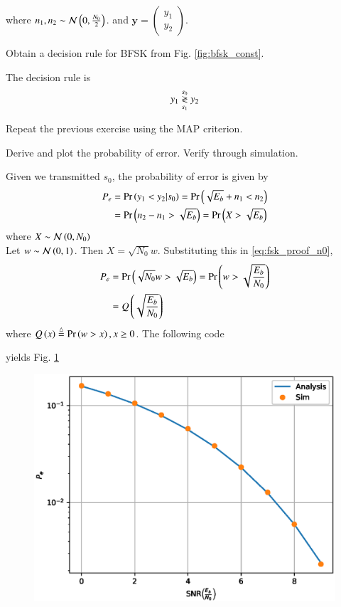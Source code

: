 \documentclass[journal,12pt,twocolumn]{IEEEtran}
\begin{document}
where $n_1,n_2 \sim \mathcal{N}\left(0,\frac{N_0}{2}\right)$. and
$
\mathbf{y} = 
\begin{pmatrix*}
y_{1}\\
 y_{2}
\end{pmatrix*}
$.
\begin{problem}
Obtain a decision rule for BFSK from Fig. \ref{fig:bfsk_const}.
\end{problem}
\solution The decision rule is
\begin{equation}
y_1 \overset{s_0}{\underset{s_1}{\gtrless}} y_2
\end{equation}
\begin{problem}
Repeat the previous exercise using the MAP criterion.
\end{problem}
\begin{problem}
Derive and plot the probability of error.  Verify through simulation.
\end{problem}
\solution Given we transmitted $s_0$, the probability of error is given by
\begin{align}
P_e &= \Pr\left(y_1 < y_2|s_0\right) = \Pr\left(\sqrt{E_b} + n_1 < n_2\right)
\\
&= \Pr\left( n_2-n_1 > \sqrt{E_b} \right) = \Pr\left( X > \sqrt{E_b} \right)
\label{eq:bfsk_proof_n0}
\end{align}
where $X \sim \mathcal{N}\left(0,N_0\right)$
\\
Let $w \sim \mathcal{N}\left(0,1\right)$.  Then $X = \sqrt{N_0}w$. Substituting this in \eqref{eq:fsk_proof_n0},
\begin{align}
P_e &=  \Pr\left( \sqrt{N_0}w > \sqrt{E_b} \right) = \Pr\left( w > \sqrt{\frac{E_b}{N_0}} \right)
\\
&= Q\left(\sqrt{\frac{E_b}{N_0}}\right)
\end{align}
where $Q\left(x\right) \stackrel{\triangle}{=} \Pr\left(w > x\right), x \ge 0$.
%
The following code

yields Fig. \ref{fig:bfsk_ber}
\begin{figure}[!h]
\centering
\includegraphics[width=\columnwidth]{./figs/bfsk_ber.eps}
\caption{}
\label{fig:bfsk_ber}
\end{figure}
\end{document}
